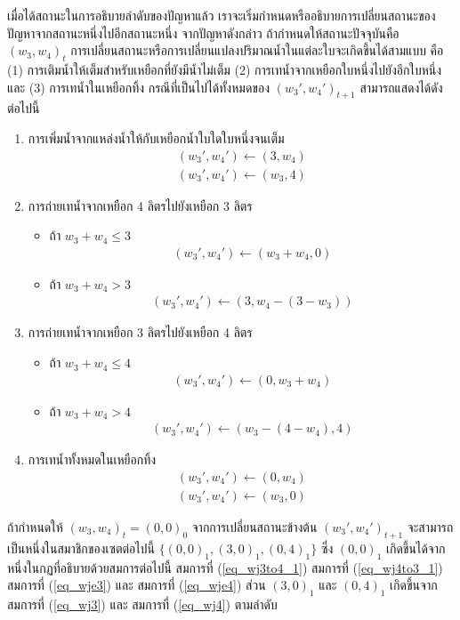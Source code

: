 \par{
เมื่อได้สถานะในการอธิบายลำดับของปัญหาแล้ว 
เราจะเริ่มกำหนดหรืออธิบายการเปลี่ยนสถานะของปัญหาจากสถานะหนึ่งไปอีกสถานะหนึ่ง
จากปัญหาดังกล่าว 
ถ้ากำหนดให้สถานะปัจจุบันคือ $(w_3, w_4)_t$ 
การเปลี่ยนสถานะหรือการเปลี่ยนแปลงปริมาณน้ำในแต่ละใบจะเกิดขึ้นได้สามแบบ
คือ (1) การเติมน้ำให้เต็มสำหรับเหยือกที่ยังมีน้ำไม่เต็ม
(2) การเทน้ำจากเหยือกใบหนึ่งไปยังอีกใบหนึ่ง และ (3) การเทน้ำในเหยือกทิ้ง
กรณีที่เป็นไปได้ทั้งหมดของ $(w_3',w_4')_{t+1}$ 
สามารถแสดงได้ดังต่อไปนี้
\begin{enumerate}
\item การเพิ่มน้ำจากแหล่งน้ำให้กับเหยือกน้ำใบใดใบหนึ่งจนเต็ม 
\begin{eqnarray}
(w_3',w_4') \leftarrow (3, w_4) \label{eq_wj3} \\
(w_3',w_4') \leftarrow (w_3, 4) \label{eq_wj4}
\end{eqnarray}
\item การถ่ายเทน้ำจากเหยือก 4 ลิตรไปยังเหยือก 3 ลิตร
\begin{itemize}
\item ถ้า $w_3 + w_4 \le 3$ 
\begin{eqnarray}
(w_3',w_4') \leftarrow (w_3+w_4, 0) \label{eq_wj4to3_1}
\end{eqnarray}
\item ถ้า $w_3 + w_4 > 3$ 
\begin{eqnarray}
(w_3',w_4') \leftarrow (3, w_4-(3-w_3)) \label{eq_wj4to3_2}
\end{eqnarray}
\end{itemize}
\item การถ่ายเทน้ำจากเหยือก 3 ลิตรไปยังเหยือก 4 ลิตร
\begin{itemize}
\item ถ้า $w_3 + w_4 \le 4$ 
\begin{eqnarray}
(w_3',w_4') \leftarrow (0, w_3+w_4) \label{eq_wj3to4_1}
\end{eqnarray}
\item ถ้า $w_3 + w_4 > 4$ 
\begin{eqnarray}
(w_3',w_4') \leftarrow (w_3-(4-w_4),4) \label{eq_wj3to4_2}
\end{eqnarray}
\end{itemize}
\item การเทน้ำทั้งหมดในเหยือกทิ้ง
\begin{eqnarray}
(w_3',w_4') \leftarrow (0, w_4) \label{eq_wje3} \\
(w_3',w_4') \leftarrow (w_3, 0) \label{eq_wje4}
\end{eqnarray}
\end{enumerate}
%
ถ้ากำหนดให้ $(w_3,w_4)_t = (0,0)_0$ จากการเปลี่ยนสถานะข้างต้น $(w_3',w_4')_{t+1}$ 
จะสามารถเป็นหนึ่งในสมาชิกของเซตต่อไปนี้ $\{(0,0)_1,(3,0)_1,(0,4)_1\}$ ซึ่ง 
$(0,0)_1$ เกิดขึ้นได้จากหนึ่งในกฏที่อธิบายด้วยสมการต่อไปนี้ สมการที่ (\ref{eq_wj3to4_1})  
สมการที่ (\ref{eq_wj4to3_1}) สมการที่ (\ref{eq_wje3}) และ 
สมการที่ (\ref{eq_wje4})
ส่วน $(3,0)_1$ และ $(0,4)_1$ เกิดขึ้นจาก 
สมการที่ (\ref{eq_wj3}) และ สมการที่ (\ref{eq_wj4}) ตามลำดับ
}
